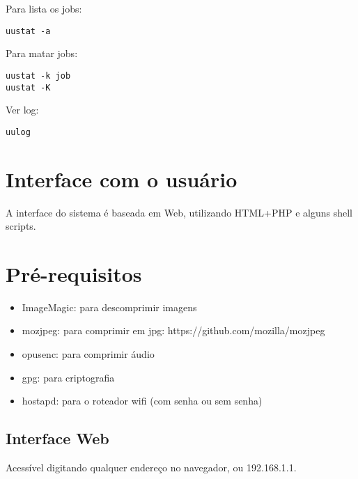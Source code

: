 \documentclass[11pt,a4paper]{article}
\begin{document}
Para lista os jobs:
\begin{verbatim}
uustat -a
\end{verbatim}

Para matar jobs:
\begin{verbatim}
uustat -k job
uustat -K
\end{verbatim}

Ver log:
\begin{verbatim}
uulog
\end{verbatim}

\section{Interface com o usuário}

A interface do sistema é baseada em Web, utilizando HTML+PHP e
alguns shell scripts.

\section{Pré-requisitos}

\begin{itemize}
\item ImageMagic: para descomprimir imagens
\item mozjpeg: para comprimir em jpg: https://github.com/mozilla/mozjpeg
\item opusenc: para comprimir áudio
\item gpg: para criptografia
\item hostapd: para o roteador wifi (com senha ou sem senha)
\end{itemize}

\subsection{Interface Web}

Acessível digitando qualquer endereço no navegador, ou 192.168.1.1.
\end{document}
